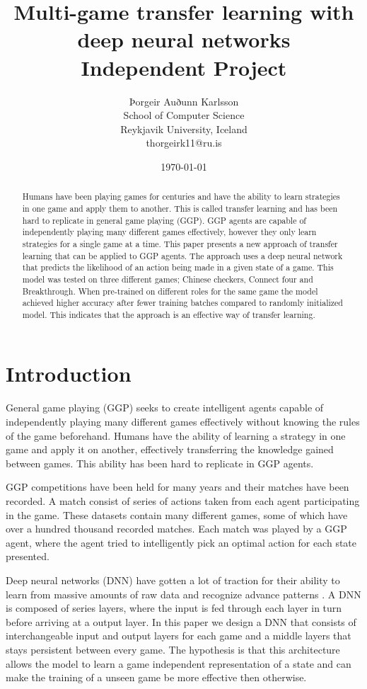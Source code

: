 \documentclass[twocolumn, letterpaper, 10 pt, conference]{ieeeconf}  %
\title{Multi-game transfer learning with deep neural networks\\ Independent Project}
\author{
Þorgeir Auðunn Karlsson \\
School of Computer Science \\
Reykjavik University, Iceland\\
thorgeirk11@ru.is\\
}
\date{\today}
\begin{document}
\maketitle
\pagestyle{plain}
\begin{abstract}
    
    Humans have been playing games for centuries and have the ability to learn strategies in one game and apply them to another. This is called transfer learning and has been hard to replicate in general game playing (GGP). GGP agents are capable of independently playing many different games effectively, however they only learn strategies for a single game at a time.
    This paper presents a new approach of transfer learning that can be applied to GGP agents. The approach uses a deep neural network that predicts the likelihood of an action being made in a given state of a game. 
    This model was tested on three different games; Chinese checkers, Connect four and Breakthrough. When pre-trained on different roles for the same game the model achieved higher accuracy after fewer training batches compared to randomly initialized model. This indicates that the approach is an effective way of transfer learning.
    
\end{abstract}  

\section{Introduction}
    General game playing (GGP) seeks to create intelligent agents capable of independently playing many different games effectively without knowing the rules of the game beforehand. Humans have the ability of learning a strategy in one game and apply it on another, effectively transferring the knowledge gained between games. This ability has been hard to replicate in GGP agents.  
    
    GGP competitions have been held for many years and their matches have been recorded. A match consist of series of actions taken from each agent participating in the game. These datasets contain many different games, some of which have over a hundred thousand recorded matches.  Each match was played by a GGP agent, where the agent tried to intelligently pick an optimal action for each state presented. 
    
    Deep neural networks (DNN) have gotten a lot of traction for their ability to learn from massive amounts of raw data and recognize advance patterns \cite{szegedy2015going}. A DNN is composed of series layers, where the input is fed through each layer in turn before arriving at a output layer. In this paper we design a DNN that consists of interchangeable input and output layers for each game and a middle layers that stays persistent between every game. The hypothesis is that this architecture allows the model to learn a game independent representation of a state and can make the training of a unseen game be more effective then otherwise.
    
\end{document}
